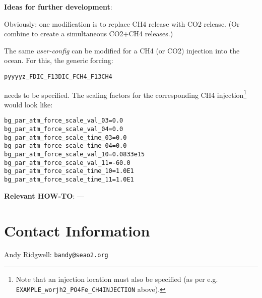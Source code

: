 \documentclass[10pt,twoside]{article}
\begin{document}
\noindent \textbf{Ideas for further development}:
\begin{compactenum}
\item Obviously: one modification is to replace CH4 release with CO2 release. (Or combine to create a simultaneous CO2+CH4 releases.)
\item The same \textit{user-config} can be modified for a CH4 (or CO2) injection into the ocean. For this, the generic forcing:
\vspace{-5pt}\begin{verbatim}pyyyyz_FDIC_F13DIC_FCH4_F13CH4\end{verbatim}\vspace{-5pt}
needs to be specified. The scaling factors for the corresponding CH4 injection\footnote{Note that an injection location must also be specified (as per e.g. \texttt{EXAMPLE\_worjh2\_PO4Fe\_CH4INJECTION} above).} would look like:
\begin{verbatim}
bg_par_atm_force_scale_val_03=0.0
bg_par_atm_force_scale_val_04=0.0
bg_par_atm_force_scale_time_03=0.0
bg_par_atm_force_scale_time_04=0.0
bg_par_atm_force_scale_val_10=0.0833e15
bg_par_atm_force_scale_val_11=-60.0
bg_par_atm_force_scale_time_10=1.0E1
bg_par_atm_force_scale_time_11=1.0E1
                \end{verbatim}
\end{compactenum}

\noindent \textbf{Relevant HOW-TO}: ---


\newpage
\section{Contact Information}

\begin{compactitem}
        \item Andy Ridgwell: \texttt{bandy@seao2.org}
\end{compactitem}

\end{document}
